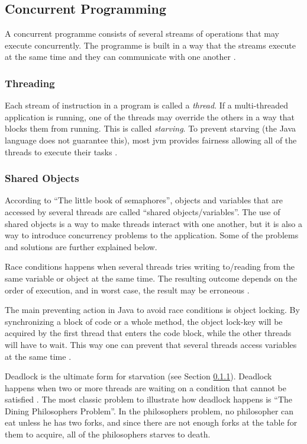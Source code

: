 \subsection{Concurrent Programming}
\label{sec:concurrentprog}
A concurrent programme consists of several streams of operations that may execute concurrently. The programme is built in a way that the streams execute at the same time and they can communicate with one another \cite{cartwright2000}.

\subsubsection{Threading}
\label{sec:threading}
Each stream of instruction in a program is called a \textit{thread}. If a multi-threaded application is running, one of the threads may override the others in a way that blocks them from running. This is called \textit{starving}. To prevent starving (the Java language does not guarantee this), most \acrshort{jvm} provides fairness allowing all of the threads to execute their tasks \cite{cartwright2000}.

\subsubsection{Shared Objects}
\label{sec:sharedobj}
According to ``The little book of semaphores''\cite{downey2008}, objects and variables that are accessed by several threads are called ``shared objects/variables''. The use of shared objects is a way to make threads interact with one another, but it is also a way to introduce concurrency problems to the application. Some of the problems and solutions are further explained below.

\label{sec:raisedcond}

Race conditions happens when several threads tries writing to/reading from the same variable or object at the same time. The resulting outcome depends on the order of execution, and in worst case, the result may be erroneous \cite{stevecarr2003}. 

\label{sec:synchronization}
The main preventing action in Java to avoid race conditions is object locking. By synchronizing a block of code or a whole method, the object lock-key will be acquired by the first thread that enters the code block, while the other threads will have to wait. This way one can prevent that several threads access variables at the same time \cite{cartwright2000}.


\newpage
{}
\label{sec:deadlock}
Deadlock is the ultimate form for starvation (see Section \ref{sec:threading}). Deadlock happens when two or more threads are waiting on a condition that cannot be satisfied \cite{sunmicrosystems2005}. The most classic problem to illustrate how deadlock happens is ``The Dining Philosophers Problem''\cite{cartwright2000v2}. In the philosophers problem, no philosopher can eat unless he has two forks, and since there are not enough forks at the table for them to acquire, all of the philosophers starves to death.